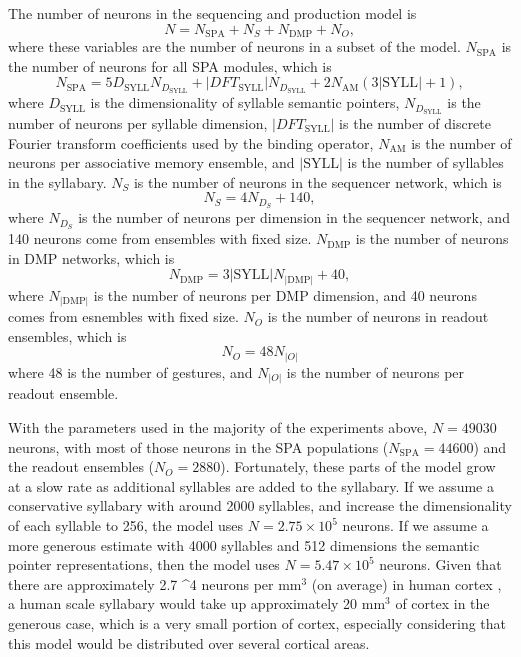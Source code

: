 The number of neurons in the
sequencing and production model is
\begin{equation}
  N = N_{\text{SPA}} + N_S + N_{\text{DMP}} + N_O,
\end{equation}
where these variables
are the number of neurons in
a subset of the model.
$N_{\text{SPA}}$ is the number of
neurons for all SPA modules,
which is
\begin{equation}
  N_{\text{SPA}} = 5 D_{\text{SYLL}} N_D_{\text{SYLL}} +
      |DFT_{\text{SYLL}}| N_D_{\text{SYLL}}
      + 2 N_{\text{AM}} (3 |\text{SYLL}| + 1),
\end{equation}
where $D_{\text{SYLL}}$ is the dimensionality
of syllable semantic pointers,
$N_D_{\text{SYLL}}$ is the number of neurons
per syllable dimension,
$|DFT_{\text{SYLL}}|$ is the number of
discrete Fourier transform coefficients
used by the binding operator,
$N_{\text{AM}}$ is the number of neurons
per associative memory ensemble,
and $|\text{SYLL}|$ is the number of
syllables in the syllabary.
$N_S$ is the number of neurons
in the sequencer network,
which is
\begin{equation}
  N_S = 4 N_D_S + 140,
\end{equation}
where $N_D_S$ is the number of neurons
per dimension in the sequencer network,
and 140 neurons come from ensembles
with fixed size.
$N_{\text{DMP}}$ is the number of neurons
in DMP networks, which is
\begin{equation}
  N_{\text{DMP}} = 3 |\text{SYLL}| N_{|\text{DMP}|} + 40,
\end{equation}
where $N_{|\text{DMP}|}$ is the number of neurons
per DMP dimension,
and 40 neurons comes from esnembles with fixed size.
$N_O$ is the number of neurons
in readout ensembles, which is
\begin{equation}
  N_O = 48 N_{|O|}
\end{equation}
where 48 is the number of gestures,
and $N_{|O|}$ is the number of neurons
per readout ensemble.

With the parameters used
in the majority of the experiments above,
$N=49030$ neurons,
with most of those neurons
in the SPA populations
($N_{\text{SPA}}=44600$)
and the readout ensembles ($N_O=2880$).
Fortunately, these parts of the model
grow at a slow rate
as additional syllables are added
to the syllabary.
If we assume a conservative syllabary
with around 2000 syllables,
and increase the dimensionality
of each syllable to 256,
the model uses
$N=2.75 \times 10^5$ neurons.
If we assume a more generous estimate
with 4000 syllables
and 512 dimensions
the semantic pointer representations,
then the model uses
$N=5.47 \times 10^5$ neurons.
Given that there are approximately
2.7 ^4 neurons per mm$^3$ (on average)
in human cortex \cite[BNID 112050]{milo2010},
a human scale syllabary would take up
approximately 20 mm$^3$ of cortex
in the generous case,
which is a very small portion of cortex,
especially considering that this model
would be distributed over
several cortical areas.

